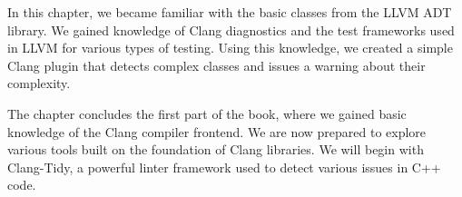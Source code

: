 In this chapter, we became familiar with the basic classes from the LLVM ADT library. We gained knowledge of Clang diagnostics and the test frameworks used in LLVM for various types of testing. Using this knowledge, we created a simple Clang plugin that detects complex classes and issues a warning about their complexity.

The chapter concludes the first part of the book, where we gained basic knowledge of the Clang compiler frontend. We are now prepared to explore various tools built on the foundation of Clang libraries. We will begin with Clang-Tidy, a powerful linter framework used to detect various issues in C++ code.